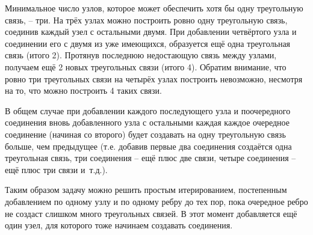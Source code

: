\solutionSection

Минимальное число узлов, которое может обеспечить хотя бы одну треугольную связь, – три. На трёх узлах можно построить ровно одну треугольную связь, соединив каждый узел с остальными двумя. При добавлении четвёртого узла и соединении его с двумя из уже имеющихся, образуется ещё одна треугольная связь (итого 2). Протянув последнюю недостающую связь между узлами, получаем ещё 2 новых треугольных связи (итого 4). Обратим внимание, что ровно три треугольных связи на четырёх узлах построить невозможно, несмотря на то, что можно построить 4 таких связи.

В общем случае при добавлении каждого последующего узла и поочередного соединения вновь добавленного узла с остальными каждая каждое очередное соединение (начиная со второго) будет создавать на одну треугольную связь больше, чем предыдущее (т.е. добавив первые два соединения создаётся одна треугольная связь, три соединения – ещё плюс две связи, четыре соединения – ещё плюс три связи и~т.д.).

Таким образом задачу можно решить простым итерированием, постепенным добавлением по одному узлу и по одному ребру до тех пор, пока очередное ребро не создаст слишком много треугольных связей. В этот момент добавляется ещё один узел, для которого тоже начинаем создавать соединения.

